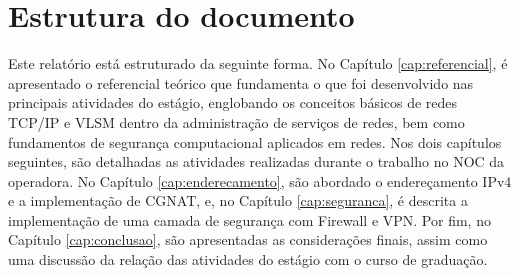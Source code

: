 \section{Estrutura do documento}

    Este relatório está estruturado da seguinte forma. No Capítulo \ref{cap:referencial}, é apresentado o referencial teórico que fundamenta o que foi desenvolvido nas principais atividades do estágio, englobando os conceitos básicos de redes TCP/IP e VLSM dentro da administração de serviços de redes, bem como fundamentos de segurança computacional aplicados em redes. Nos dois capítulos seguintes, são detalhadas as atividades realizadas durante o trabalho no NOC da operadora. No Capítulo \ref{cap:enderecamento}, são abordado o endereçamento IPv4 e a implementação de CGNAT, e, no Capítulo \ref{cap:seguranca}, é descrita a implementação de uma camada de segurança com Firewall e VPN. Por fim, no Capítulo \ref{cap:conclusao}, são apresentadas as considerações finais, assim como uma discussão da relação das atividades do estágio com o curso de graduação.
    
